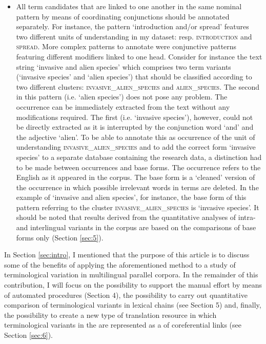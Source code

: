 \documentclass[output=paper]{langsci/langscibook.cls}
\begin{document}
\begin{itemize}
\item All term candidates that are linked to one another in the same nominal pattern 
by means of coordinating conjunctions should be annotated separately. For instance, 
the pattern `introduction and/or spread' features two different units of understanding 
in my dataset: resp. \textsc{introduction} and \textsc{spread}. More complex patterns 
to annotate were conjunctive patterns featuring different modifiers linked to one 
head. Consider for instance the text string `invasive and alien species' which 
comprises two term variants (`invasive species' and `alien species') that 
should be classified according to two different clusters: \textsc{invasive\_alien\_species} 
and \textsc{alien\_species}. The second  in this pattern (i.e. `alien 
species') does not pose any problem. The occurrence can be immediately extracted 
from the text without any modifications required. The first  (i.e. 
`invasive species'), however, could not be directly extracted as it is interrupted 
by the conjunction word `and' and the adjective `alien'. To be able to annotate 
this  as occurrence of the unit of understanding \textsc{invasive\_alien\_species} 
and to add the correct form `invasive species' to a separate database containing 
the research data, a distinction had to be made between occurrences and base forms. 
The occurrence refers to the English  as it appeared in the corpus. 
The base form is a `cleaned' version of the occurrence in which possible irrelevant 
words in  terms are deleted. In the example of `invasive and alien species', 
for instance, the base form of this pattern referring to the cluster \textsc{invasive\_alien\_species} 
is `invasive species'. It should be noted that results derived from the quantitative 
analyses of intra- and interlingual variants in the corpus are based on the comparisons 
of base forms only (Section \ref{sec:5}). 

\end{itemize}

In Section \ref{sec:intro}, I mentioned that the purpose of this article is to discuss some of the benefits of applying the aforementioned method to a study of terminological 
variation in multilingual parallel corpora. In the remainder of this contribution, I will focus on the possibility to support the manual effort by means of automated 
procedures (Section 4), the possibility to carry out quantitative comparison of 
terminological variants in lexical chains (see Section 5) and, finally, the possibility 
to create a new type of translation resource in which terminological variants in 
the  are represented as a  of coreferential links (see Section \ref{sec:6}). %
\end{document}
